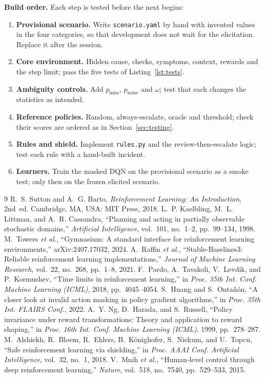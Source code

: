 \documentclass[11pt,a4paper]{article}
\begin{document}
\textbf{Build order.} Each step is tested before the next begins:
\begin{enumerate}
  \item \textbf{Provisional scenario.} Write \texttt{scenario.yaml} by hand with invented values in the four categories, so that development does not wait for the elicitation. Replace it after the session.
  \item \textbf{Core environment.} Hidden cause, checks, symptoms, context, rewards and the step limit; pass the five tests of Listing~\ref{lst:tests}.
  \item \textbf{Ambiguity controls.} Add $p_{\text{miss}}$, $p_{\text{noise}}$ and $\omega$; test that each changes the statistics as intended.
  \item \textbf{Reference policies.} Random, always-escalate, oracle and threshold; check their scores are ordered as in Section~\ref{sec:testing}.
  \item \textbf{Rules and shield.} Implement \texttt{rules.py} and the review-then-escalate logic; test each rule with a hand-built incident.
  \item \textbf{Learners.} Train the masked DQN on the provisional scenario as a smoke test; only then on the frozen elicited scenario.
\end{enumerate}

\begin{thebibliography}{9}\small
{} R.~S. Sutton and A.~G. Barto, \emph{Reinforcement Learning: An Introduction}, 2nd~ed. Cambridge, MA, USA: MIT Press, 2018.
 L.~P. Kaelbling, M.~L. Littman, and A.~R. Cassandra, ``Planning and acting in partially observable stochastic domains,'' \emph{Artificial Intelligence}, vol.~101, no.~1--2, pp.~99--134, 1998.
 M.~Towers \emph{et al.}, ``Gymnasium: A standard interface for reinforcement learning environments,'' arXiv:2407.17032, 2024.
 A.~Raffin \emph{et al.}, ``Stable-Baselines3: Reliable reinforcement learning implementations,'' \emph{Journal of Machine Learning Research}, vol.~22, no.~268, pp.~1--8, 2021.
 F.~Pardo, A.~Tavakoli, V.~Levdik, and P.~Kormushev, ``Time limits in reinforcement learning,'' in \emph{Proc. 35th Int. Conf. Machine Learning (ICML)}, 2018, pp.~4045--4054.
 S.~Huang and S.~Onta\~n\'on, ``A closer look at invalid action masking in policy gradient algorithms,'' in \emph{Proc. 35th Int. FLAIRS Conf.}, 2022.
 A.~Y. Ng, D.~Harada, and S.~Russell, ``Policy invariance under reward transformations: Theory and application to reward shaping,'' in \emph{Proc. 16th Int. Conf. Machine Learning (ICML)}, 1999, pp.~278--287.
 M.~Alshiekh, R.~Bloem, R.~Ehlers, B.~K\"onighofer, S.~Niekum, and U.~Topcu, ``Safe reinforcement learning via shielding,'' in \emph{Proc. AAAI Conf. Artificial Intelligence}, vol.~32, no.~1, 2018.
 V.~Mnih \emph{et al.}, ``Human-level control through deep reinforcement learning,'' \emph{Nature}, vol.~518, no.~7540, pp.~529--533, 2015.
\end{thebibliography}
\end{document}
